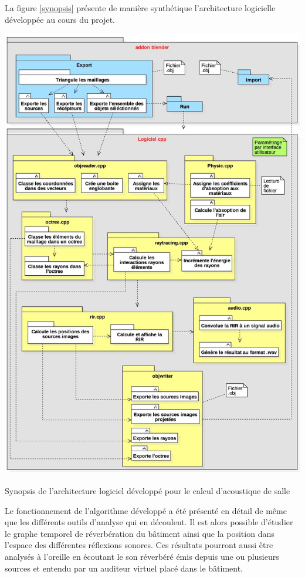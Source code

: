 La figure \ref{synopsis} présente de manière synthétique l'architecture logicielle développée au cours du projet. 
\begin{figureth}
	\includegraphics[width=\linewidth]{images/synopsis}
	\caption{Synopsis de l'architecture logiciel développé pour le calcul d'acoustique de salle}
	\label{synopsis}
\end{figureth}

Le fonctionnement de l'algorithme développé a été présenté en détail de même que les différents outils d'analyse qui en découlent. Il est alors possible d'étudier le graphe temporel de réverbération du bâtiment ainsi que la position dans l'espace des différentes réflexions sonores. Ces résultats pourront aussi être analysés à l'oreille en écoutant le son réverbéré émis depuis une ou plusieurs sources et entendu par un auditeur virtuel placé dans le bâtiment.

